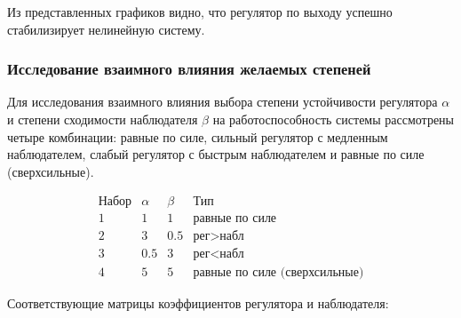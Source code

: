 \documentclass[a4paper,12pt]{article}
\begin{document}
Из представленных графиков видно, что регулятор по выходу успешно стабилизирует нелинейную систему. 


	
\subsubsection{Исследование взаимного влияния желаемых степеней}

Для исследования взаимного влияния выбора степени устойчивости регулятора \(\alpha\) и степени сходимости наблюдателя \(\beta\) на работоспособность системы рассмотрены четыре комбинации: равные по силе, сильный регулятор с медленным наблюдателем, слабый регулятор с быстрым наблюдателем и равные по силе (сверхсильные).

\[
\begin{array}{c|c|c|c}
	\text{Набор} & \alpha & \beta & \text{Тип} \\ \hline
	1 & 1 & 1 & \text{равные по силе} \\
	2 & 3 & 0.5 & \text{рег} > \text{набл} \\
	3 & 0.5 & 3 & \text{рег} < \text{набл} \\
	4 & 5 & 5 & \text{равные по силе (сверхсильные)}
\end{array}
\]

Соответствующие матрицы коэффициентов регулятора и наблюдателя:
\end{document}
